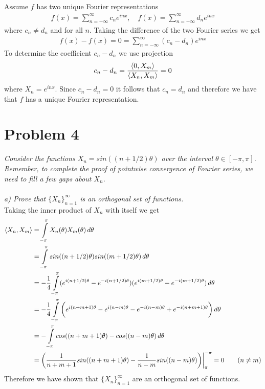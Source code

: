 \documentclass[12pt]{article}
\theoremstyle{remark}
\begin{document}
Assume $f$ has two unique Fourier representations 
\begin{align*}
	f(x) = \sum\limits_{n = -\infty}^\infty c_n e^{inx}, \quad f(x) = \sum\limits_{n = -\infty}^\infty d_ne^{inx}
\end{align*}
where $c_n \neq d_n$ and for all $n$. Taking the difference of the two Fourier series we get
\begin{align*}
	f(x) - f(x) = 0 = \sum\limits_{n=-\infty}^\infty (c_n-d_n)e^{inx}
\end{align*}
To determine the coefficient $c_n - d_n$ we use projection
\begin{align*}
	c_n - d_n = \frac{\braket{0, X_m}}{\braket{X_n, X_m}} = 0
\end{align*}
where $X_n = e^{inx}$. Since $c_n - d_n = 0$ it follows that $c_n = d_n$ and therefore we have that $f$ has a unique Fourier representation.

\newpage

\section*{Problem 4}

\textit{Consider the functions $X_n = sin((n+1/2)\theta)$ over the interval $\theta \in [-\pi, \pi]$. Remember, to complete the proof of pointwise convergence of Fourier series, we need to fill a few gaps about $X_n$.} \\ \\
\textit{a) Prove that $\{X_n\}_{n=1}^\infty$ is an orthogonal set of functions.} \\

Taking the inner product of $X_n$ with itself we get
\begin{align*}
\braket{X_n, X_m} & = \int\limits_{-\pi}^\pi X_n(\theta)X_m(\theta) \, d\theta \\
& = \int\limits_{-\pi}^\pi sin((n+1/2)\theta)sin((m+1/2)\theta) \, d\theta \\
& = -\frac{1}{4}\int\limits_{-\pi}^{\pi} (e^{i(n+1/2)\theta} - e^{-i(n+1/2)\theta})(e^{i(m+1/2)\theta} - e^{-i(m+1/2)\theta}) \, d\theta \\
& = -\frac{1}{4}\int\limits_{-\pi}^{\pi} \bigg( e^{i(n+m+1)\theta} - e^{i(n-m)\theta} - e^{-i(n-m)\theta} + e^{-i(n+m+1)\theta} \bigg) \, d\theta \\
& = -\int\limits_{-\pi}^{\pi} cos((n+m+1)\theta) - cos((n-m)\theta) \, d\theta \\ 
& = \bigg( \frac{1}{n+m+1}sin((n+m+1)\theta) - \frac{1}{n-m}sin((n-m)\theta) \bigg)\bigg\vert_{\pi}^{-\pi} = 0 \tag{$n \neq m$} \\	
\end{align*}
Therefore we have shown that $\{X_n\}_{n=1}^\infty$ are an orthogonal set of functions. \\ 
\end{document}
